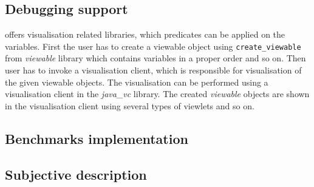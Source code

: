 \subsection{Debugging support}
\eclipse offers visualisation related libraries, which predicates can be applied 
on the variables. First the user has to create a viewable object using \texttt{create\_viewable}
from {\em viewable} library which contains variables in a proper order and so on. Then
user has to invoke a visualisation client, which is responsible for visualisation of the 
given viewable objects. The visualisation can be performed using a visualisation client
in the {\em java\_vc} library. The created {\em viewable} objects are shown in
the visualisation client using several types of viewlets and so on. 

\subsection{Benchmarks implementation}

\subsection{Subjective description}